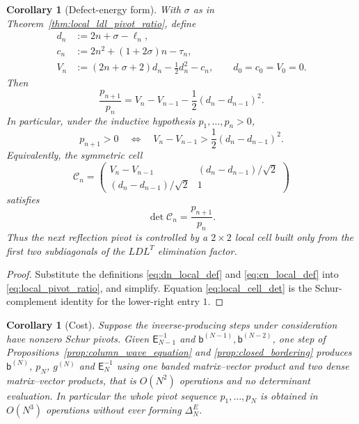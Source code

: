\documentclass[11pt]{amsart}
\numberwithin{equation}{section}
\theoremstyle{plain}
\newtheorem{corollary}[theorem]{Corollary}
\theoremstyle{definition}
\theoremstyle{remark}
\newcommand{\E}{\mathsf E}
\begin{document}
\begin{corollary}[Defect-energy form]
\label{cor:defect_energy_pivot}
With $\sigma$ as in Theorem~\ref{thm:local_ldl_pivot_ratio}, define
\begin{align}
 d_n&:=2n+\sigma-\ell_n,\label{eq:dn_local_def}\\
 c_n&:=2n^2+(1+2\sigma)n-\tau_n,\label{eq:cn_local_def}\\
 V_n&:=(2n+\sigma+2)d_n-\frac12d_n^2-c_n,
 \qquad d_0=c_0=V_0=0.
 \label{eq:Vn_local_def}
\end{align}
Then
\begin{equation}
 \boxed{\;
 \frac{p_{n+1}}{p_n}
 =V_n-V_{n-1}-\frac12(d_n-d_{n-1})^2.\;}
 \label{eq:defect_energy_ratio}
\end{equation}
In particular, under the inductive hypothesis $p_1,\dots,p_n>0$,
\begin{equation}
 p_{n+1}>0
 \quad\Longleftrightarrow\quad
 V_n-V_{n-1}>\frac12(d_n-d_{n-1})^2.
 \label{eq:defect_energy_sign}
\end{equation}
Equivalently, the symmetric cell
\begin{equation}
 \mathcal C_n=
 \begin{pmatrix}
 V_n-V_{n-1} & (d_n-d_{n-1})/\sqrt2\\[2pt]
 (d_n-d_{n-1})/\sqrt2 & 1
 \end{pmatrix}
 \label{eq:local_cell_def}
\end{equation}
satisfies
\begin{equation}
 \det\mathcal C_n=\frac{p_{n+1}}{p_n}.
 \label{eq:local_cell_det}
\end{equation}
Thus the next reflection pivot is controlled by a $2\times2$ local cell built only from
the first two subdiagonals of the $LDL^T$ elimination factor.
\end{corollary}

\begin{proof}
Substitute the definitions \eqref{eq:dn_local_def} and
\eqref{eq:cn_local_def} into \eqref{eq:local_pivot_ratio}, and simplify.  Equation \eqref{eq:local_cell_det} is the
Schur-complement identity for the lower-right entry $1$.
\end{proof}

\begin{corollary}[Cost]
\label{cor:two_generator_cost}
Suppose the inverse-producing steps under consideration have nonzero Schur pivots.
Given $\E_{N-1}^{-1}$ and $\mathsf b^{(N-1)},\mathsf b^{(N-2)}$, one step of
Propositions~\ref{prop:column_wave_equation} and \ref{prop:closed_bordering} produces
$\mathsf b^{(N)}$, $p_N$, $g^{(N)}$ and $\E_N^{-1}$ using one banded matrix--vector product
and two dense matrix--vector products, that is $O(N^2)$ operations and no determinant
evaluation.  In particular the whole pivot sequence $p_1,\dots,p_N$ is obtained in
$O(N^3)$ operations without ever forming $\Delta_N^E$.
\end{corollary}
\end{document}
